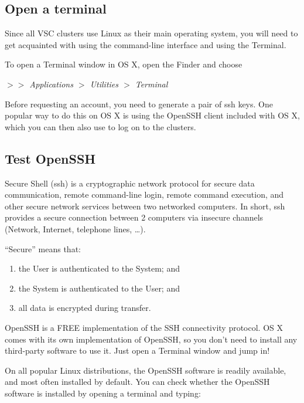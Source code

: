 \fi


\ifmac

  \subsection{Open a terminal}
  \label{sec:open-a-terminal}

  Since all VSC clusters use Linux as their main operating system, you will
  need to get acquainted with using the command-line interface and using the
  Terminal.

  To open a Terminal window in OS X, open the Finder and choose

  \emph{$>$$>$ Applications $>$ Utilities $>$ Terminal}

  Before requesting an account, you need to generate a pair of ssh keys. One
  popular way to do this on OS X is using the OpenSSH client included with OS
  X, which you can then also use to log on to the clusters.

  \subsection{Test OpenSSH}
  \label{sec:test-openssh}

  Secure Shell (ssh) is a cryptographic network protocol for secure data
  communication, remote command-line login, remote command execution, and other
  secure network services between two networked computers. In short, ssh
  provides a secure connection between 2 computers via insecure channels
  (Network, Internet, telephone lines, \ldots).

  ``Secure'' means that:

  \begin{enumerate}
    \item  the User is authenticated to the System; and
    \item  the System is authenticated to the User; and
    \item  all data is encrypted during transfer.
  \end{enumerate}

  OpenSSH is a FREE implementation of the SSH connectivity protocol. OS X comes
  with its own implementation of OpenSSH, so you don't need to install any
  third-party software to use it. Just open a Terminal window and jump in!

  On all popular Linux distributions, the OpenSSH software is readily
  available, and most often installed by default. You can check whether the
  OpenSSH software is installed by opening a terminal and typing:

